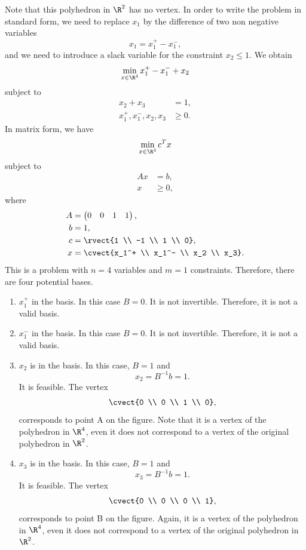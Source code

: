 Note that this polyhedron in $\R^2$ has no vertex. In order to write
the problem in standard form, we need to replace $x_1$ by the
difference of two non negative variables
\[
x_1 = x_1^+ - x_1^-,
\]
and we need to introduce a slack variable for the constraint $x_2 \leq 1$.
We obtain
\[
\min_{x \in \R^4} x_1^+ - x_1^-  + x_2
\]
subject to
\begin{align*}
  x_2 + x_3 &= 1, \\
  x_1^+, x_1^-, x_2, x_3 &\geq 0.
\end{align*}
In matrix form, we have
\[
\min_{x \in \R^4} c^T x
\]
subject to
\begin{align*}
  Ax &= b, \\
  x &\geq 0,
\end{align*}
where
\begin{align*}
  A &= \begin{pmatrix}
    0 & 0 & 1 & 1 
  \end{pmatrix}, \\
  b &= 1, \\
  c &= \rvect{1 \\ -1 \\ 1 \\ 0},\\
  x &= \cvect{x_1^+ \\ x_1^- \\ x_2 \\ x_3}.
\end{align*}
This is a problem with $n=4$ variables and $m=1$
constraints. Therefore, there are four potential bases.
\begin{enumerate}
\item $x_1^+$ in the basis. In this case $B=0$. It is not
  invertible. Therefore, it is not a valid basis. 
\item $x_1^-$ in the basis. In this case $B=0$. It is not
  invertible. Therefore, it is not a valid basis.
\item $x_2$ is in the basis. In this case, $B=1$ and
  \[
  x_2=B^{-1}b=1.
  \]
  It is feasible. The vertex
  \[
\cvect{0 \\ 0 \\ 1 \\ 0},
\]
corresponds to point A on the figure. Note that it is a vertex of
the polyhedron in $\R^4$, even it does not correspond to a vertex of
the original polyhedron in $\R^2$.
\item $x_3$ is in the basis. In this case, $B=1$ and
  \[
  x_3=B^{-1}b=1.
  \]
  It is feasible. The vertex
  \[
\cvect{0 \\ 0 \\ 0 \\ 1},
\]
corresponds to point B on the figure. Again, it is a vertex of
the polyhedron in $\R^4$, even it does not correspond to a vertex of
the original polyhedron in $\R^2$.
\end{enumerate}


